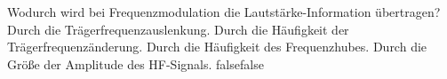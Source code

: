     {Wodurch wird bei Frequenzmodulation die Lautstärke-Information übertragen?}
    {Durch die Trägerfrequenzauslenkung.}
    {Durch die Häufigkeit der Trägerfrequenzänderung.}
    {Durch die Häufigkeit des Frequenzhubes.}
    {Durch die Größe der Amplitude des HF-Signals.}
    {false}{false}